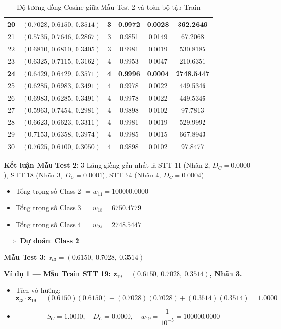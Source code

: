 \documentclass[12pt,a4paper]{article}
\begin{document}
\begin{table}[H]
{\begin{tabular}{|c|c|c|c|c|c|}
20 & $(0.7028,\ 0.6150,\ 0.3514)$ & 3 & 0.9972 & 0.0028 & 362.2646 \\ \hline
21 & $(0.5735,\ 0.7646,\ 0.2867)$ & 3 & 0.9851 & 0.0149 & 67.2068 \\ \hline
22 & $(0.6810,\ 0.6810,\ 0.3405)$ & 3 & 0.9981 & 0.0019 & 530.8185 \\ \hline
23 & $(0.6325,\ 0.7115,\ 0.3162)$ & 4 & 0.9953 & 0.0047 & 210.6351 \\ \hline
\textbf{24} & \textbf{$(0.6429,\ 0.6429,\ 0.3571)$} & \textbf{4} & \textbf{0.9996} & \textbf{0.0004} & \textbf{2748.5447} \\ \hline
25 & $(0.6285,\ 0.6983,\ 0.3491)$ & 4 & 0.9978 & 0.0022 & 449.5346 \\ \hline
26 & $(0.6983,\ 0.6285,\ 0.3491)$ & 4 & 0.9978 & 0.0022 & 449.5346 \\ \hline
27 & $(0.5963,\ 0.7454,\ 0.2981)$ & 4 & 0.9898 & 0.0102 & 97.7813 \\ \hline
28 & $(0.6623,\ 0.6623,\ 0.3311)$ & 4 & 0.9981 & 0.0019 & 529.9992 \\ \hline
29 & $(0.7153,\ 0.6358,\ 0.3974)$ & 4 & 0.9985 & 0.0015 & 667.8943 \\ \hline
30 & $(0.7625,\ 0.6100,\ 0.3050)$ & 4 & 0.9898 & 0.0102 & 97.8477 \\ \hline
\end{tabular}%
}
\caption{Độ tương đồng Cosine giữa Mẫu Test 2 và toàn bộ tập Train}
\end{table}
 
\textbf{Kết luận Mẫu Test 2:} 3 Láng giềng gần nhất là STT 11 (Nhãn 2, $D_C=0.0000$), STT 18 (Nhãn 3, $D_C=0.0001$), STT 24 (Nhãn 4, $D_C=0.0004$).
\begin{itemize}
    \item Tổng trọng số Class 2 $= w_{11} = 100000.0000$
    \item Tổng trọng số Class 3 $= w_{18} = 6750.4779$
    \item Tổng trọng số Class 4 $= w_{24} = 2748.5447$
\end{itemize}
$\implies$ \textbf{Dự đoán: Class 2}
 
\vspace{0.5cm}
 
\textbf{Mẫu Test 3: $x_{t3} = (0.6150,\ 0.7028,\ 0.3514)$}
 
\vspace{0.3cm}
\textbf{Ví dụ 1 — Mẫu Train STT 19: $\mathbf{z}_{19} = (0.6150,\ 0.7028,\ 0.3514)$, Nhãn 3.}
\begin{itemize}
    \item Tích vô hướng:
    \[
        \mathbf{z}_{t3} \cdot \mathbf{z}_{19}
        = (0.6150)(0.6150) + (0.7028)(0.7028) + (0.3514)(0.3514) = 1.0000
    \]
    \item
    \[
        S_C = 1.0000, \quad D_C = 0.0000, \quad
        w_{19} = \frac{1}{10^{-5}} = 100000.0000
    \]
\end{itemize}
 
\end{document}
